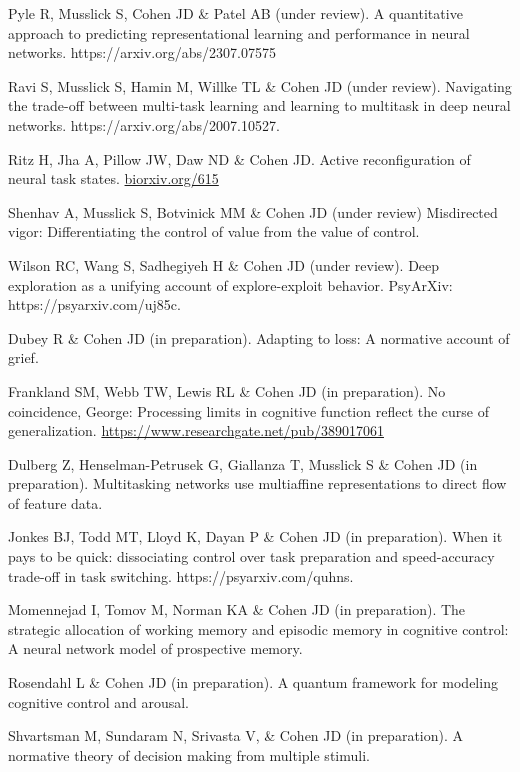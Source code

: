 \documentclass[10 pt]{article}
\begin{document}
Pyle R, Musslick S, Cohen JD \& Patel AB (under review). A quantitative approach to predicting representational learning and performance in neural networks. https://arxiv.org/abs/2307.07575

Ravi S, Musslick S, Hamin M, Willke TL \& Cohen JD (under review). Navigating the trade-off between multi-task learning and learning to multitask in deep neural networks. https://arxiv.org/abs/2007.10527.

Ritz H, Jha A, Pillow JW, Daw ND \& Cohen JD. Active reconfiguration of neural task states. \href{https://www.biorxiv.org/content/10.1101/2024.09.29.615736v1}{biorxiv.org/615}

Shenhav A, Musslick S, Botvinick MM \& Cohen JD (under review) Misdirected vigor: Differentiating
the control of value from the value of control.

Wilson RC, Wang S, Sadhegiyeh H \& Cohen JD (under review). Deep exploration as a unifying account of explore-exploit behavior. PsyArXiv: https://psyarxiv.com/uj85c.

Dubey R \& Cohen JD (in preparation). Adapting to loss: A normative account of grief.

Frankland SM, Webb TW, Lewis RL \& Cohen JD (in preparation). No coincidence, George: Processing limits in cognitive function reflect the curse of generalization. \href{https://www.researchgate.net/publication/389017061_No_Coincidence_George_Processing_Limits_in_Cognitive_Function_Reflect_the_Curse_of_Generalization}
{https://www.researchgate.net/pub/389017061}

Dulberg Z, Henselman-Petrusek G, Giallanza T, Musslick S \& Cohen JD (in preparation). Multitasking networks use multiaffine representations to direct flow of feature data.

Jonkes BJ, Todd MT, Lloyd K, Dayan P \& Cohen JD (in preparation). When it pays to be quick: dissociating control over task preparation and speed-accuracy trade-off in task switching. https://psyarxiv.com/quhns.

Momennejad I, Tomov M, Norman KA \& Cohen JD (in preparation). The strategic allocation of working memory and episodic memory in cognitive control: A neural network model of prospective memory.

Rosendahl L \& Cohen JD (in preparation). A quantum framework for modeling cognitive control and arousal.

Shvartsman M, Sundaram N, Srivasta V, \& Cohen JD (in preparation). A normative theory of decision making from multiple stimuli.
\end{document}
